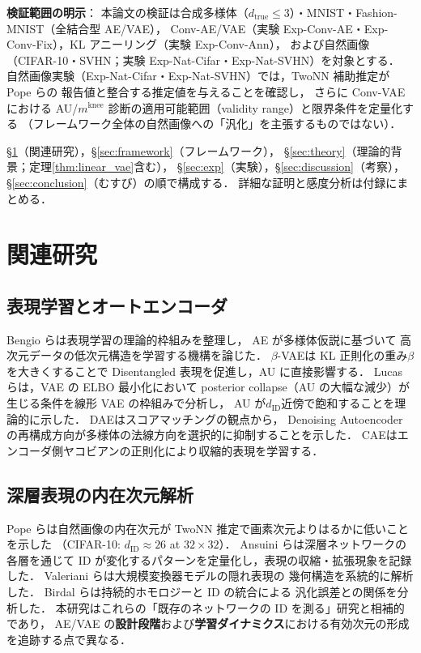 \documentclass[11pt,a4paper]{jsarticle}
\newcommand{\mknee}{m^{\mathrm{knee}}}
\begin{document}
\textbf{検証範囲の明示}：
本論文の検証は合成多様体（$d_{\mathrm{true}} \leq 3$）・MNIST・Fashion-MNIST（全結合型 AE/VAE），
Conv-AE/VAE（実験 Exp-Conv-AE・Exp-Conv-Fix），KL アニーリング（実験 Exp-Conv-Ann），
および自然画像（CIFAR-10・SVHN；実験 Exp-Nat-Cifar・Exp-Nat-SVHN）を対象とする．
自然画像実験（Exp-Nat-Cifar・Exp-Nat-SVHN）では，TwoNN 補助推定が Pope ら\cite{pope2021intrinsic}の
報告値と整合する推定値を与えることを確認し，
さらに Conv-VAE における AU/$\mknee$ 診断の適用可能範囲（validity range）と限界条件を定量化する
（フレームワーク全体の自然画像への「汎化」を主張するものではない）．

§\ref{sec:related}（関連研究），§\ref{sec:framework}（フレームワーク），
§\ref{sec:theory}（理論的背景；定理\ref{thm:linear_vae}含む），
§\ref{sec:exp}（実験），§\ref{sec:discussion}（考察），§\ref{sec:conclusion}（むすび）の順で構成する．
詳細な証明と感度分析は付録にまとめる．

\section{関連研究}\label{sec:related}

\subsection{表現学習とオートエンコーダ}\label{sec:related_ae}

Bengio ら\cite{bengio2013representation}は表現学習の理論的枠組みを整理し，
AE が多様体仮説\cite{fefferman2016manifold}に基づいて
高次元データの低次元構造を学習する機構を論じた．
$\beta$-VAE\cite{higgins2017betavae}は KL 正則化の重み$\beta$を大きくすることで
Disentangled 表現を促進し，AU に直接影響する．
Lucas ら\cite{lucas2019elbo}は，VAE の ELBO 最小化において
posterior collapse（AU の大幅な減少）が生じる条件を線形 VAE の枠組みで分析し，
AU が$d_{\mathrm{ID}}$近傍で飽和することを理論的に示した．
DAE\cite{alain2014dae}はスコアマッチングの観点から，
Denoising Autoencoder の再構成方向が多様体の法線方向を選択的に抑制することを示した．
CAE\cite{rifai2011cae}はエンコーダ側ヤコビアンの正則化により収縮的表現を学習する．

\subsection{深層表現の内在次元解析}\label{sec:related_id}

Pope ら\cite{pope2021intrinsic}は自然画像の内在次元が
TwoNN 推定で画素次元よりはるかに低いことを示した
（CIFAR-10: $d_\mathrm{ID} \approx 26$ at $32 \times 32$）．
Ansuini ら\cite{ansuini2019intrinsic}は深層ネットワークの各層を通じて
ID が変化するパターンを定量化し，表現の収縮・拡張現象を記録した．
Valeriani ら\cite{valeriani2023geometry}は大規模変換器モデルの隠れ表現の
幾何構造を系統的に解析した．
Birdal ら\cite{birdal2021intrinsic}は持続的ホモロジーと ID の統合による
汎化誤差との関係を分析した．
本研究はこれらの「既存のネットワークの ID を測る」研究と相補的であり，
AE/VAE の\textbf{設計段階}および\textbf{学習ダイナミクス}における有効次元の形成を追跡する点で異なる．
\end{document}
